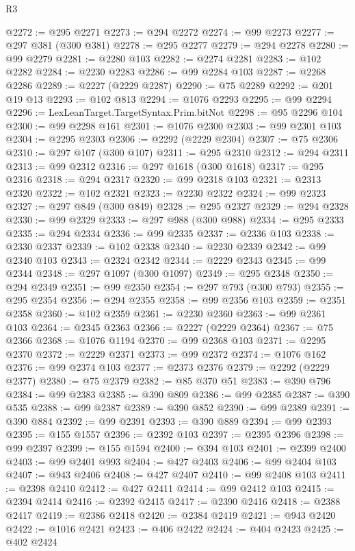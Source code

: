 \begin{lexlean}{R3}
\begin{coremodule}
@2272 := @295 @2271
@2273 := @294 @2272
@2274 := @99 @2273
@2277 := @297 @381 (@300 @381)
@2278 := @295 @2277
@2279 := @294 @2278
@2280 := @99 @2279
@2281 := @2280 @103
@2282 := @2274 @2281
@2283 := @102 @2282
@2284 := @2230 @2283
@2286 := @99 @2284 @103
@2287 := @2268 @2286
@2289 := @2227 (@2229 @2287)
@2290 := @75 @2289
@2292 := @201 @19 @13
@2293 := @102 @813
@2294 := @1076 @2293
@2295 := @99 @2294
@2296 := LexLeanTarget.TargetSyntax.Prim.bitNot
@2298 := @95 @2296 @104
@2300 := @99 @2298 @161
@2301 := @1076 @2300
@2303 := @99 @2301 @103
@2304 := @2295 @2303
@2306 := @2292 (@2229 @2304)
@2307 := @75 @2306
@2310 := @297 @107 (@300 @107)
@2311 := @295 @2310
@2312 := @294 @2311
@2313 := @99 @2312
@2316 := @297 @1618 (@300 @1618)
@2317 := @295 @2316
@2318 := @294 @2317
@2320 := @99 @2318 @103
@2321 := @2313 @2320
@2322 := @102 @2321
@2323 := @2230 @2322
@2324 := @99 @2323
@2327 := @297 @849 (@300 @849)
@2328 := @295 @2327
@2329 := @294 @2328
@2330 := @99 @2329
@2333 := @297 @988 (@300 @988)
@2334 := @295 @2333
@2335 := @294 @2334
@2336 := @99 @2335
@2337 := @2336 @103
@2338 := @2330 @2337
@2339 := @102 @2338
@2340 := @2230 @2339
@2342 := @99 @2340 @103
@2343 := @2324 @2342
@2344 := @2229 @2343
@2345 := @99 @2344
@2348 := @297 @1097 (@300 @1097)
@2349 := @295 @2348
@2350 := @294 @2349
@2351 := @99 @2350
@2354 := @297 @793 (@300 @793)
@2355 := @295 @2354
@2356 := @294 @2355
@2358 := @99 @2356 @103
@2359 := @2351 @2358
@2360 := @102 @2359
@2361 := @2230 @2360
@2363 := @99 @2361 @103
@2364 := @2345 @2363
@2366 := @2227 (@2229 @2364)
@2367 := @75 @2366
@2368 := @1076 @1194
@2370 := @99 @2368 @103
@2371 := @2295 @2370
@2372 := @2229 @2371
@2373 := @99 @2372
@2374 := @1076 @162
@2376 := @99 @2374 @103
@2377 := @2373 @2376
@2379 := @2292 (@2229 @2377)
@2380 := @75 @2379
@2382 := @85 @370 @51
@2383 := @390 @796
@2384 := @99 @2383
@2385 := @390 @809
@2386 := @99 @2385
@2387 := @390 @535
@2388 := @99 @2387
@2389 := @390 @852
@2390 := @99 @2389
@2391 := @390 @884
@2392 := @99 @2391
@2393 := @390 @889
@2394 := @99 @2393
@2395 := @155 @1557
@2396 := @2392 @103
@2397 := @2395 @2396
@2398 := @99 @2397
@2399 := @155 @1594
@2400 := @394 @103
@2401 := @2399 @2400
@2403 := @99 @2401 @993
@2404 := @427 @2403
@2406 := @99 @2404 @103
@2407 := @943 @2406
@2408 := @427 @2407
@2410 := @99 @2408 @103
@2411 := @2398 @2410
@2412 := @427 @2411
@2414 := @99 @2412 @103
@2415 := @2394 @2414
@2416 := @2392 @2415
@2417 := @2390 @2416
@2418 := @2388 @2417
@2419 := @2386 @2418
@2420 := @2384 @2419
@2421 := @943 @2420
@2422 := @1016 @2421
@2423 := @406 @2422
@2424 := @404 @2423
@2425 := @402 @2424

\end{coremodule}
\end{lexlean}
